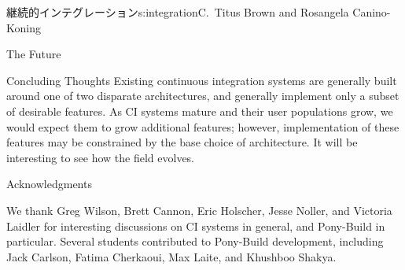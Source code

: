 \begin{aosachapter}{継続的インテグレーション}{s:integration}{C.\ Titus Brown and Rosangela Canino-Koning}
\begin{aosasect1}{The Future}
\begin{aosasect2}{Concluding Thoughts}
Existing continuous integration systems are generally built around one
of two disparate architectures, and generally implement only a subset
of desirable features.  As CI systems mature and their user
populations grow, we would expect them to grow additional features;
however, implementation of these features may be constrained by the
base choice of architecture.  It will be interesting to see how the
field evolves.

\end{aosasect2}

\begin{aosasect2}{Acknowledgments}

We thank Greg Wilson, Brett Cannon, Eric Holscher, Jesse Noller, and
Victoria Laidler for interesting discussions on CI systems in general,
and Pony-Build in particular.  Several students contributed to
Pony-Build development, including Jack Carlson, Fatima Cherkaoui, Max
Laite, and Khushboo Shakya.

\end{aosasect2}

\end{aosasect1}

\end{aosachapter}

